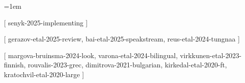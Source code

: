 \documentclass[a4paper, 12pt]{article}
\title{%
  \trans{%
    Списък на цитиранията%
  }{%
    List of Citations%
  }
}
\date{}
\author{}
\begin{document}
  \maketitle

  \emergencystretch=1em

  \begin{pubenumerate}


    [
      senyk-2025-implementing
    ]

    [
      gerazov-etal-2025-review,
      bai-etal-2025-speakstream,
      reus-etal-2024-tungnaa
    ]



    [
      margova-bruinsma-2024-look,
      varona-etal-2024-bilingual,
      virkkunen-etal-2023-finnish,
      rouvalis-2023-grec,
      dimitrova-2021-bulgarian,
      kirkedal-etal-2020-ft,
      kratochvil-etal-2020-large
    ]

  \end{pubenumerate}
\end{document}
